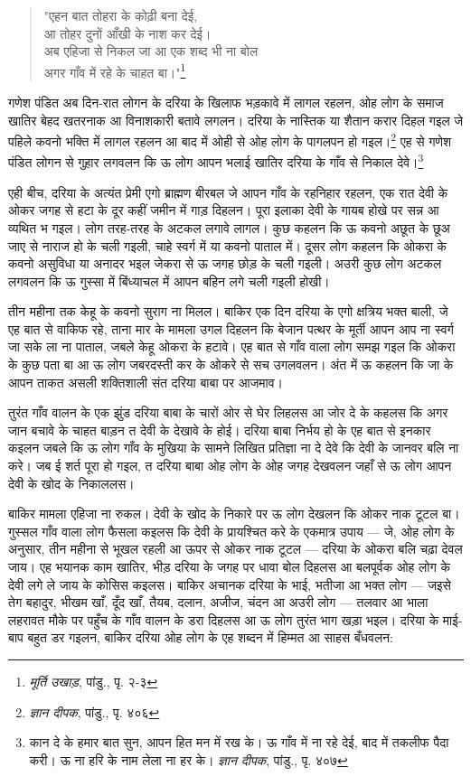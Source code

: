 \begin{quote}
"एहन बात तोहरा के कोढ़ी बना देई, \\
आ तोहर दुनों आँखी के नाश कर देई। \\
अब एहिजा से निकल जा आ एक शब्द भी ना बोल \\
अगर गाँव में रहे के चाहत बा।"\footnote{\textit{मूर्ति उखाड़}, पांडु., पृ. २-३}
\end{quote}

गणेश पंडित अब दिन-रात लोगन के दरिया के खिलाफ भड़कावे में लागल रहलन, ओह लोग के समाज खातिर बेहद खतरनाक आ विनाशकारी बतावे लगलन। दरिया के नास्तिक या शैतान करार दिहल गइल जे पहिले कवनो भक्ति में लागल रहलन आ बाद में ओही से ओह लोग के पागलपन हो गइल।\footnote{\textit{ज्ञान दीपक}, पांडु., पृ. ४०६} एह से गणेश पंडित लोगन से गुहार लगवलन कि ऊ लोग आपन भलाई खातिर दरिया के गाँव से निकाल देवे।\footnote{कान दे के हमार बात सुन, आपन हित मन में रख के। ऊ गाँव में ना रहे देई, बाद में तकलीफ पैदा करी। ऊ ना हरि के नाम लेला ना हर के। \textit{ज्ञान दीपक}, पांडु., पृ. ४०७}

एही बीच, दरिया के अत्यंत प्रेमी एगो ब्राह्मण बीरबल जे आपन गाँव के रहनिहार रहलन, एक रात देवी के ओकर जगह से हटा के दूर कहीं जमीन में गाड़ दिहलन। पूरा इलाका देवी के गायब होखे पर सन्न आ व्यथित भ गइल। लोग तरह-तरह के अटकल लगावे लागल। कुछ कहलन कि ऊ कवनो अछूत के छूअ जाए से नाराज हो के चली गइली, चाहे स्वर्ग में या कवनो पाताल में। दूसर लोग कहलन कि ओकरा के कवनो असुविधा या अनादर भइल जेकरा से ऊ जगह छोड़ के चली गइली। अउरी कुछ लोग अटकल लगवलन कि ऊ गुस्सा में बिंध्याचल में आपन बहिन लगे चली गइली होखी।

तीन महीना तक केहू के कवनो सुराग ना मिलल। बाकिर एक दिन दरिया के एगो क्षत्रिय भक्त बाली, जे एह बात से वाकिफ रहे, ताना मार के मामला उगल दिहलन कि बेजान पत्थर के मूर्ती आपन आप ना स्वर्ग जा सके ला ना पाताल, जबले केहू ओकरा के हटावे। एह बात से गाँव वाला लोग समझ गइल कि ओकरा के कुछ पता बा आ ऊ लोग जबरदस्ती कर के ओकरे से सच उगलवलन। अंत में ऊ कहलन कि जा के आपन ताकत असली शक्तिशाली संत दरिया बाबा पर आजमाव।

तुरंत गाँव वालन के एक झुंड दरिया बाबा के चारों ओर से घेर लिहलस आ जोर दे के कहलस कि अगर जान बचावे के चाहत बाड़न त देवी के देखावे के होई। दरिया बाबा निर्भय हो के एह बात से इनकार कइलन जबले कि ऊ लोग गाँव के मुखिया के सामने लिखित प्रतिज्ञा ना दे देवे कि देवी के जानवर बलि ना करे। जब ई शर्त पूरा हो गइल, त दरिया बाबा ओह लोग के ओह जगह देखवलन जहाँ से ऊ लोग आपन देवी के खोद के निकाललस।

बाकिर मामला एहिजा ना रुकल। देवी के खोद के निकारे पर ऊ लोग देखलन कि ओकर नाक टूटल बा। गुस्सल गाँव वाला लोग फैसला कइलस कि देवी के प्रायश्चित करे के एकमात्र उपाय — जे, ओह लोग के अनुसार, तीन महीना से भूखल रहली आ ऊपर से ओकर नाक टूटल — दरिया के ओकरा बलि चढ़ा देवल जाय। एह भयानक काम खातिर, भीड़ दरिया के जगह पर धावा बोल दिहलस आ बलपूर्वक ओह लोग के देवी लगे ले जाय के कोसिस कइलस। बाकिर अचानक दरिया के भाई, भतीजा आ भक्त लोग — जइसे तेग बहादुर, भीखम खाँ, दूँद खाँ, तैयब, दलान, अजीज, चंदन आ अउरी लोग — तलवार आ भाला लहरावत मौके पर पहुँच के गाँव वालन के डरा दिहलस आ ऊ लोग तुरंत भाग खड़ा भइल। दरिया के माई-बाप बहुत डर गइलन, बाकिर दरिया ओह लोग के एह शब्दन में हिम्मत आ साहस बँधवलन:


